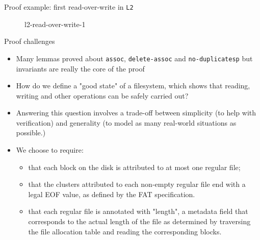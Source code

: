 \documentclass{beamer}
\begin{document}
\begin{frame}{Proof example: first read-over-write in \texttt{L2}}
  \begin{figure}
    \caption{l2-read-over-write-1}
  \end{figure}
\end{frame}

\begin{frame}{Proof challenges}
  \begin{itemize}
  \item Many lemmas proved about \texttt{assoc},
    \texttt{delete-assoc} and \texttt{no-duplicatesp} but invariants
    are really the core of the proof
  \item How do we define a "good state" of a filesystem, which shows
    that reading, writing and other operations can be safely carried
    out?
  \item Answering this question involves a trade-off between
    simplicity (to help with verification) and generality (to model as
    many real-world situations as possible.)
  \item We choose to require:
    \begin{itemize}
    \item that each block on the disk is attributed to at most one
      regular file;
    \item that the clusters attributed to each non-empty regular file
      end with a legal EOF value, as defined by the FAT specification.
    \item that each regular file is annotated with "length", a
      metadata field that corresponds to the actual length of the file
      as determined by traversing the file allocation table and
      reading the corresponding blocks.
    \end{itemize}
  \end{itemize}
\end{frame}
\end{document}
